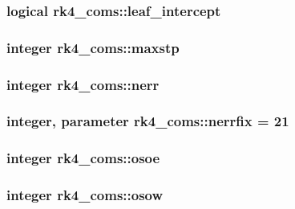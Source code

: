 \subsubsection[{\texorpdfstring{leaf\+\_\+intercept}{leaf_intercept}}]{\setlength{\rightskip}{0pt plus 5cm}logical rk4\+\_\+coms\+::leaf\+\_\+intercept}\hypertarget{namespacerk4__coms_ab6eb51e1fa8b861cc6fb6359631bdec3}{}\label{namespacerk4__coms_ab6eb51e1fa8b861cc6fb6359631bdec3}
\subsubsection[{\texorpdfstring{maxstp}{maxstp}}]{\setlength{\rightskip}{0pt plus 5cm}integer rk4\+\_\+coms\+::maxstp}\hypertarget{namespacerk4__coms_a9fc78b38e070c62f9669f9db9d966784}{}\label{namespacerk4__coms_a9fc78b38e070c62f9669f9db9d966784}
\subsubsection[{\texorpdfstring{nerr}{nerr}}]{\setlength{\rightskip}{0pt plus 5cm}integer rk4\+\_\+coms\+::nerr}\hypertarget{namespacerk4__coms_a8e2fcadf9c0fe34be391e95bd3caa31c}{}\label{namespacerk4__coms_a8e2fcadf9c0fe34be391e95bd3caa31c}
\subsubsection[{\texorpdfstring{nerrfix}{nerrfix}}]{\setlength{\rightskip}{0pt plus 5cm}integer, parameter rk4\+\_\+coms\+::nerrfix = 21}\hypertarget{namespacerk4__coms_a8f0596202fc6dc04e70e600a544ae155}{}\label{namespacerk4__coms_a8f0596202fc6dc04e70e600a544ae155}
\subsubsection[{\texorpdfstring{osoe}{osoe}}]{\setlength{\rightskip}{0pt plus 5cm}integer rk4\+\_\+coms\+::osoe}\hypertarget{namespacerk4__coms_a62d65ed745bfd02b36c79be5861b7cee}{}\label{namespacerk4__coms_a62d65ed745bfd02b36c79be5861b7cee}
\subsubsection[{\texorpdfstring{osow}{osow}}]{\setlength{\rightskip}{0pt plus 5cm}integer rk4\+\_\+coms\+::osow}\hypertarget{namespacerk4__coms_ac28f34645e6cd2065bc8c458ae43f642}{}\label{namespacerk4__coms_ac28f34645e6cd2065bc8c458ae43f642}

